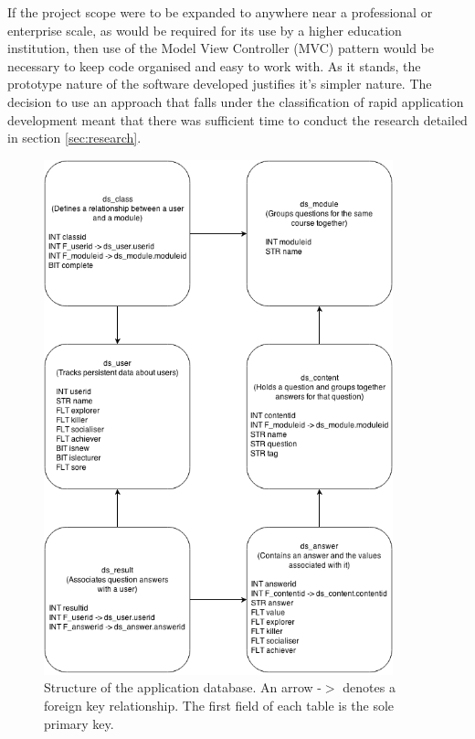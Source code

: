 \documentclass[12pt,a4paper,twoside]{report}
\begin{document}
If the project scope were to be expanded to anywhere near a professional or enterprise scale, as would be required for its use by a higher education institution, then use of the Model View Controller (MVC) pattern would be necessary to keep code organised and easy to work with. As it stands, the prototype nature of the software developed justifies it's simpler nature. The decision to use an approach that falls under the classification of rapid application development meant that there was sufficient time to conduct the research detailed in section \ref{sec:research}.

\begin{figure}
	\begin{center}
		\includegraphics[width=0.9\textwidth]{../img/database.png}
		\caption{Structure of the application database. An arrow -$>$ denotes a foreign key relationship. The first field of each table is the sole primary key.}
		\label{database}
	\end{center}
\end{figure}
\end{document}
